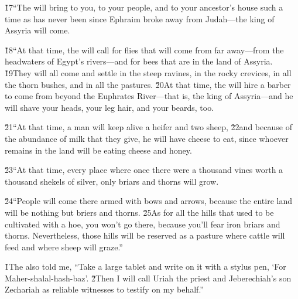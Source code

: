 \v{17}``The  will bring to you, to your people, and to your ancestor's house such a time as has never been since Ephraim broke away from Judah---the king of Assyria will come.

\v{18}``At that time, the  will call for flies that will come from far away---from the headwaters of Egypt's rivers---and for bees that are in the land of Assyria. \v{19}They will all come and settle in the steep ravines, in the rocky crevices, in all the thorn bushes, and in all the pastures. \v{20}At that time, the  will hire a barber to come from beyond the Euphrates River---that is, the king of Assyria---and he will shave your heads, your leg hair, and your beards, too.

\v{21}``At that time, a man will keep alive a heifer and two sheep, \v{22}and because of the abundance of milk that they give, he will have cheese to eat, since whoever remains in the land will be eating cheese and honey.

\v{23}``At that time, every place where once there were a thousand vines worth a thousand shekels of silver, only briars and thorns will grow.

\v{24}``People will come there armed with bows and arrows, because the entire land will be nothing but briers and thorns. \v{25}As for all the hills that used to be cultivated with a hoe, you won't go there, because you'll fear iron briars and thorns. Nevertheless, those hills will be reserved as a pasture where cattle will feed and where sheep will graze.''

\v{1}The  also told me, ``Take a large tablet and write on it with a stylus pen, `For Maher-shalal-hash-baz'. \v{2}Then I will call Uriah the priest and Jeberechiah's son Zechariah as reliable witnesses to testify on my behalf.''

